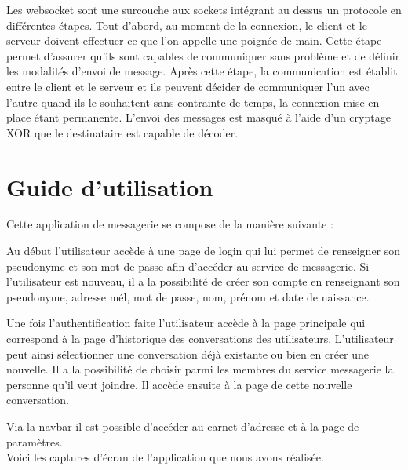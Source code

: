 \par Les websocket sont une surcouche aux sockets intégrant au dessus un protocole en différentes étapes.
Tout d'abord, au moment de la connexion, le client et le serveur doivent effectuer ce que l'on appelle une poignée de main.
Cette étape permet d'assurer qu'ils sont capables de communiquer sans problème et de définir les modalités d'envoi de message.
Après cette étape, la communication est établit entre le client et le serveur et ils peuvent décider de communiquer l'un avec l'autre 
quand ils le souhaitent sans contrainte de temps, la connexion mise en place étant permanente. 
L'envoi des messages est masqué à l'aide d'un cryptage XOR que le destinataire est capable de décoder.

\section{Guide d'utilisation}

\par Cette application de messagerie se compose de la manière suivante : \\

\par Au début l'utilisateur accède à une page de login qui lui permet de renseigner son pseudonyme et son mot de passe afin d'accéder au service de messagerie. Si l'utilisateur est nouveau, il a la possibilité de créer son compte en renseignant son pseudonyme, adresse mél, mot de passe, nom, prénom et date de naissance. 
\par Une fois l'authentification faite l'utilisateur accède à la page principale qui correspond à la page d'historique des conversations des utilisateurs. L'utilisateur peut ainsi sélectionner une conversation déjà existante ou bien en créer une nouvelle. Il a la possibilité de choisir parmi les membres du service messagerie la personne qu'il veut joindre. Il accède ensuite à la page de cette nouvelle conversation.
\par Via la navbar il est possible d'accéder au carnet d'adresse et à la page de paramètres. \\

Voici les captures d'écran de l'application que nous avons réalisée.



